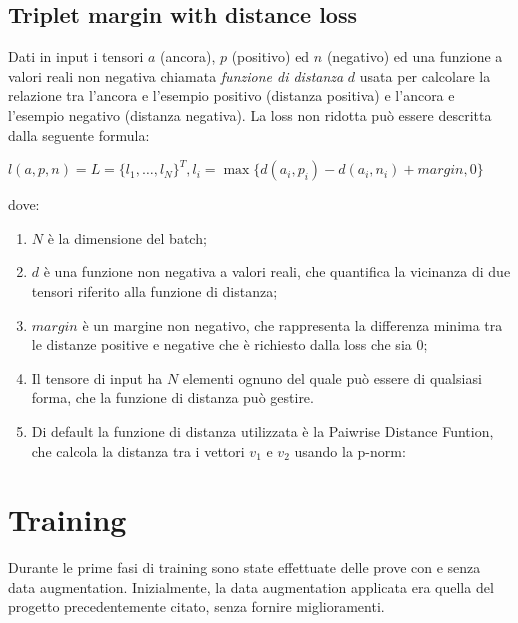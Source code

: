 \documentclass[11pt]{article}
\begin{document}
\subsection{Triplet margin with distance loss}
Dati in input i tensori $a$ (ancora), $p$ (positivo) ed $n$ (negativo) ed una funzione a valori
reali non negativa chiamata \textit{funzione di distanza} $d$ usata per calcolare la relazione tra
l'ancora e l'esempio positivo (distanza positiva) e l'ancora e l'esempio negativo (distanza negativa). La loss non ridotta può essere descritta dalla seguente formula:

\begin{center}
    $l(a,p,n) = L = { \{ l_1, \ldots, l_N \}}^T, l_i = \max{\{ d(a_i, p_i) - d(a_i, n_i) + margin, 0 \}} $
\end{center}

dove:

\begin{enumerate}
    \item $N$ è la dimensione del batch;
    \item {$d$ è una funzione non negativa a valori reali, che quantifica la vicinanza di due tensori riferito
    alla funzione di distanza;}
    \item {$margin$ 
        è un margine non negativo, che rappresenta la differenza minima
        tra le distanze positive e negative che è richiesto dalla loss che sia 0;
    }
    \item Il tensore di input ha $N$ elementi ognuno del quale può essere di qualsiasi forma, che la funzione di distanza può gestire.

    \item {
        Di default la funzione di distanza utilizzata è la Paiwrise Distance Funtion,
        che calcola la distanza tra i vettori $v_1$ e $v_2$ usando la p-norm:
    }

\end{enumerate}


\pagebreak
\section{Training}

Durante le prime fasi di training sono state effettuate delle prove con e senza data augmentation. Inizialmente, la data augmentation applicata
era quella del progetto precedentemente citato, senza fornire miglioramenti.
\end{document}
